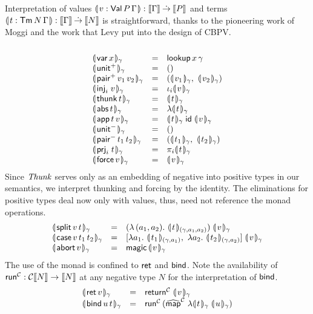 \documentclass[sigplan,screen,fleqn,review]{acmart} %
\begin{document}
Interpretation of values
$\denty{ v : \PValTm P \Gamma } : \den \Gamma \todot \den P$
and terms
$\denty{ t : \Tm N \Gamma } : \den \Gamma \todot \den N$
is straightforward, thanks to the pioneering work of
Moggi \cite{moggi:infcomp91} and the work that
Levy \cite{levy:hosc06}
put into the design of CBPV.
\[
\begin{array}{lcl}
  \\
  \dent{\tvar\,x}\gamma & = & \tlookup\,x\,\gamma \\
  \dent{\punit}\gamma   & = & \ttempty \\
  \dent{\ppair\,v_1\,v_2}\gamma & = &
    (\dent{v_1}\gamma,\ \dent{v_2}\gamma) \\
  \dent{\inj i v}\gamma & = & \iota_i \dent v \gamma \\
  \dent{\tthunk\,t}\gamma & = & \dent t \gamma \\
  \dent{\tabs\,t}\gamma
      & = & \fdent t \gamma \\
  \dent{\tapp\,t\,v} \gamma & = &
     \dent t \gamma\;\tid\;\dent v \gamma \\
  \dent{\nunit}\gamma & = & \ttempty \\
  \dent{\npair\,t_1\,t_2}\gamma & = &
    (\dent{t_1}\gamma,\ \dent{t_2}\gamma) \\
  \dent{\prj i t}\gamma & = & \pi_i \dent t \gamma \\
  \dent{\tforce\,v}\gamma & = & \dent v \gamma \\
\end{array}
\]
Since $\tThunk$ serves only as an embedding of negative into positive
types in our semantics,
we interpret thunking and forcing by the identity.
The eliminations for positive types deal now only with values, thus,
need not reference the monad operations.
\[
\begin{array}{lcl}
  \dent{\tsplit\,v\,t}\gamma & = & (\lambda\,(a_1,a_2).\
    \dent{t}{(\gamma,a_1,a_2)} ) \; \dent v \gamma \\
  \dent{\tcase\,v\,t_1\,t_2}\gamma & = &
    [  \lambda a_1.\ \dent{t_1}{(\gamma,a_1)}
    ,\ \lambda a_2.\ \dent{t_2}{(\gamma,a_2)}
    ]\; \dent v \gamma \\
  \dent{\tabort\,v}\gamma & = & \tmagic\,\dent v \gamma \\
\end{array}
\]
The use of the monad is confined to $\tret$ and $\tbind$.
Note the availability of $\trun^\C : \C \den N \to \den N$
at any negative type $N$ for the interpretation of $\tbind$.
\[
\begin{array}{lcl}
  \dent{\tret\,v}\gamma & = & \treturn[\C] \; \dent v \gamma \\
  \dent{\tbind\,u\,t}\gamma & = & \trun^\C\,
    (\stmap[\C] \; \fdent t \gamma\; \dent u \gamma) \\
\end{array}
\]
\end{document}
